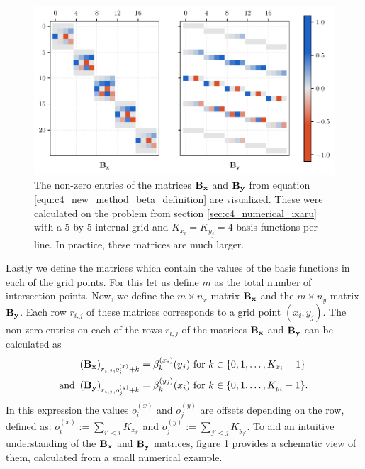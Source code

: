 \begin{figure}
    \begin{center}
        \includegraphics[width=\textwidth]{img/chapter4/new_method_beta.pdf}
        \caption{The non-zero entries of the matrices $\vb{B_x}$ and $\vb{B_y}$ from equation \eqref{equ:c4_new_method_beta_definition} are visualized. These were calculated on the problem from section \ref{sec:c4_numerical_ixaru} with a 5 by 5 internal grid and $K_{x_i} = K_{y_j} = 4$ basis functions per line. In practice, these matrices are much larger.}
        \label{fig:c4_new_method_beta}
    \end{center}
\end{figure}

Lastly we define the matrices which contain the values of the basis functions in each of the grid points. For this let us define $m$ as the total number of intersection points. Now, we define the $m \times n_x$ matrix $\vb{B_x}$ and the $m \times n_y$ matrix $\vb{B_y}$. Each row $r_{i,j}$ of these matrices corresponds to a grid point $(x_i, y_j)$. The non-zero entries on each of the rows $r_{i,j}$ of the matrices $\vb{B_x}$ and $\vb{B_y}$ can be calculated as
\begin{align}
    \left(\vb{B_x}\right)_{r_{i,j}, o^{(x)}_{i} + k} & =  \beta_{k}^{(x_i)}(y_j) \text{ for $k \in \{0, 1, \dots, K_{x_i} - 1\}$ }   \nonumber                               \\
    \text{and }
    \left(\vb{B_y}\right)_{r_{i,j}, o^{(y)}_{j} + k} & =  \beta_{k}^{(y_j)}(x_i) \text{ for $k \in \{0, 1, \dots, K_{y_i} - 1\}$.} \label{equ:c4_new_method_beta_definition}
\end{align}
In this expression the values $o^{(x)}_{i}$ and $o^{(y)}_{j}$ are offsets depending on the row, defined as: $o^{(x)}_{i} := \sum_{i' < i} K_{x_{i'}}$ and $o^{(y)}_{j} := \sum_{j' < j} K_{y_{j'}}$. To aid an intuitive understanding of the $\vb{B_x}$ and $\vb{B_y}$ matrices, figure \ref{fig:c4_new_method_beta} provides a schematic view of them, calculated from a small numerical example.

